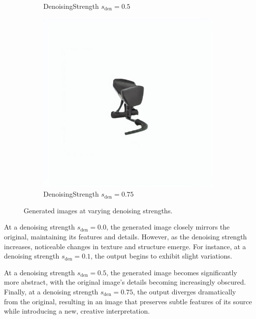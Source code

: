 \documentclass[12pt,DIV14,BCOR12mm,a4paper,footinclude=false,headinclude,parskip=half-,twoside,openright,cleardoublepage=empty,toc=index,bibliography=totoc,listof=totoc]{scrreprt}
\numberwithin{equation}{chapter}
\begin{document}
\begin{figure}
\begin{subfigure}{0.23\textwidth}
        \caption{Denoising\hspace{0.2em}Strength $s_{\text{den}} = 0.5$}
    \end{subfigure}
    \begin{subfigure}{0.23\textwidth} %
        \centering
        \includegraphics[width=\linewidth]{../media/image_0.75.png} %
        \caption{Denoising\hspace{0.2em}Strength $s_{\text{den}} = 0.75$}
    \end{subfigure}
		\caption{Generated images at varying denoising strengths.}
    \label{fig:denoising_effect}
\end{figure}


At a denoising strength $s_{\text{den}} = 0.0$, the generated image closely mirrors the original, maintaining its features and details. However, as the denoising strength increases, noticeable changes in texture and structure emerge. For instance, at a denoising strength $s_{\text{den}} = 0.1$, the output begins to exhibit slight variations.

At a denoising strength $s_{\text{den}} = 0.5$, the generated image becomes significantly more abstract, with the original image’s details becoming increasingly obscured. Finally, at a denoising strength $s_{\text{den}} = 0.75$, the output diverges dramatically from the original, resulting in an image that preserves subtle features of its source while introducing a new, creative interpretation.
\end{document}
